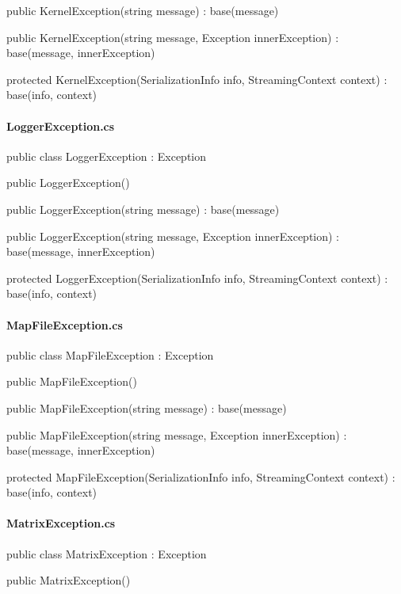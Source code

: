 \begin{flushleft}
\begin{cscode}
{    public KernelException(string message) : base(message)
    {
    }

    public KernelException(string message, Exception innerException) : base(message, innerException)
    {
    }

    protected KernelException(SerializationInfo info, StreamingContext context) : base(info, context)
    {
    }
}
    \end{cscode}
    
    \paragraph{LoggerException.cs}
    \begin{cscode}
[Serializable]
public class LoggerException : Exception
{
    public LoggerException()
    {
    }

    public LoggerException(string message) : base(message)
    {
    }

    public LoggerException(string message, Exception innerException) : base(message, innerException)
    {
    }

    protected LoggerException(SerializationInfo info, StreamingContext context) : base(info, context)
    {
    }
}
    \end{cscode}
    
    \paragraph{MapFileException.cs}
    \begin{cscode}
[Serializable]
public class MapFileException : Exception
{
    public MapFileException()
    {
    }

    public MapFileException(string message) : base(message)
    {
    }

    public MapFileException(string message, Exception innerException) : base(message, innerException)
    {
    }

    protected MapFileException(SerializationInfo info, StreamingContext context) : base(info, context)
    {
    }
}
    \end{cscode}
    
    \paragraph{MatrixException.cs}
    \begin{cscode}
[Serializable]
public class MatrixException : Exception
{
    public MatrixException()
    {
    }

}
\end{cscode}
\end{flushleft}
